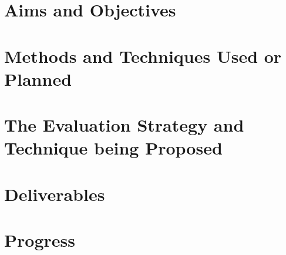 \documentclass[12pt, twoside]{report}
\begin{document}
	
	\section{Aims and Objectives}
	
	\section{Methods and Techniques Used or Planned}
	
	\section{The Evaluation Strategy and Technique being Proposed}
	
	\section{Deliverables}
	
	\section{Progress}
	
\end{document}
